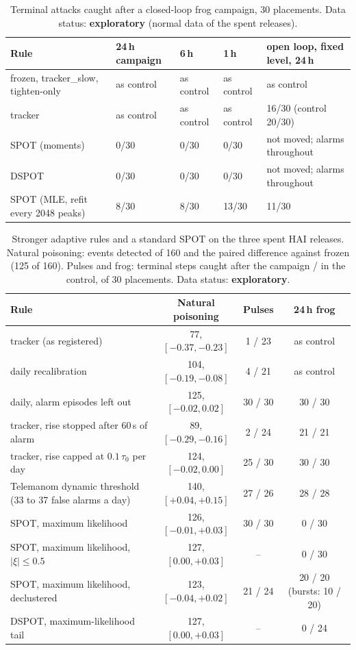 \documentclass[sigconf]{acmart}
\begin{document}
\begin{table}[t]
\caption{Terminal attacks caught after a closed-loop frog campaign, 30 placements. Data status:
\textbf{exploratory} (normal data of the spent releases).}
\label{tab:frog}
\begin{tabular}{@{}lllll@{}}
\toprule
Rule & 24\,h campaign & 6\,h & 1\,h & open loop, fixed level, 24\,h \\
\midrule
frozen, tracker\_slow, tighten-only & as control & as control & as control & as control \\
tracker & as control & as control & as control & 16/30 (control 20/30) \\
SPOT (moments) & 0/30 & 0/30 & 0/30 & not moved; alarms throughout \\
DSPOT & 0/30 & 0/30 & 0/30 & not moved; alarms throughout \\
SPOT (MLE, refit every 2048 peaks) & 8/30 & 8/30 & 13/30 & 11/30 \\
\bottomrule
\end{tabular}
\end{table}

\begin{table}[t]
\caption{Stronger adaptive rules and a standard SPOT on the three spent HAI releases. Natural poisoning:
events detected of 160 and the paired difference against frozen (125 of 160). Pulses and frog: terminal
steps caught after the campaign / in the control, of 30 placements. Data status: \textbf{exploratory}.}
\label{tab:stronger}
\begin{tabularx}{\textwidth}{@{}Lccc@{}}
\toprule
Rule & Natural poisoning & Pulses & 24\,h frog \\
\midrule
tracker (as registered) & 77, $[-0.37, -0.23]$ & 1 / 23 & as control \\
daily recalibration & 104, $[-0.19, -0.08]$ & 4 / 21 & as control \\
daily, alarm episodes left out & 125, $[-0.02, 0.02]$ & 30 / 30 & 30 / 30 \\
tracker, rise stopped after 60\,s of alarm & 89, $[-0.29, -0.16]$ & 2 / 24 & 21 / 21 \\
tracker, rise capped at $0.1\,\tau_0$ per day & 124, $[-0.02, 0.00]$ & 25 / 30 & 30 / 30 \\
Telemanom dynamic threshold (33 to 37 false alarms a day) & 140, $[+0.04, +0.15]$ & 27 / 26 & 28 / 28 \\
SPOT, maximum likelihood & 126, $[-0.01, +0.03]$ & 30 / 30 & 0 / 30 \\
SPOT, maximum likelihood, $|\xi| \le 0.5$ & 127, $[0.00, +0.03]$ & -- & 0 / 30 \\
SPOT, maximum likelihood, declustered & 123, $[-0.04, +0.02]$ & 21 / 24 & 20 / 20 (bursts: 10 / 20) \\
DSPOT, maximum-likelihood tail & 127, $[0.00, +0.03]$ & -- & 0 / 24 \\
\bottomrule
\end{tabularx}
\end{table}
\end{document}
